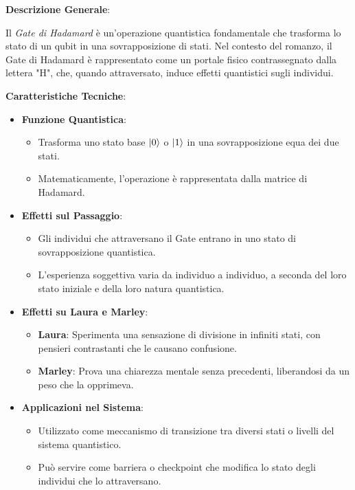\begin{tcolorbox}[fontupper=\tiny, fontlower=\Large,colback=white,colframe=black,title=\textbf{Gate di Hadamard}]
\begin{multicols}{2}
\textbf{Descrizione Generale}:

Il \emph{Gate di Hadamard} è un'operazione quantistica fondamentale che trasforma lo stato di un qubit in una sovrapposizione di stati. Nel contesto del romanzo, il Gate di Hadamard è rappresentato come un portale fisico contrassegnato dalla lettera "H", che, quando attraversato, induce effetti quantistici sugli individui.

\textbf{Caratteristiche Tecniche}:

\begin{itemize}
    \item \textbf{Funzione Quantistica}:
    \begin{itemize}
        \item Trasforma uno stato base $\ket{0}$ o $\ket{1}$ in una sovrapposizione equa dei due stati.
        \item Matematicamente, l'operazione è rappresentata dalla matrice di Hadamard.
    \end{itemize}
    \item \textbf{Effetti sul Passaggio}:
    \begin{itemize}
        \item Gli individui che attraversano il Gate entrano in uno stato di sovrapposizione quantistica.
        \item L'esperienza soggettiva varia da individuo a individuo, a seconda del loro stato iniziale e della loro natura quantistica.
    \end{itemize}
    \item \textbf{Effetti su Laura e Marley}:
    \begin{itemize}
        \item \textbf{Laura}: Sperimenta una sensazione di divisione in infiniti stati, con pensieri contrastanti che le causano confusione.
        \item \textbf{Marley}: Prova una chiarezza mentale senza precedenti, liberandosi da un peso che la opprimeva.
    \end{itemize}
    \item \textbf{Applicazioni nel Sistema}:
    \begin{itemize}
        \item Utilizzato come meccanismo di transizione tra diversi stati o livelli del sistema quantistico.
        \item Può servire come barriera o checkpoint che modifica lo stato degli individui che lo attraversano.
    \end{itemize}
\end{itemize}


\end{multicols}
\end{tcolorbox}
